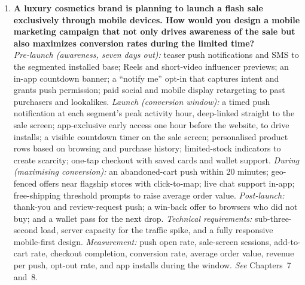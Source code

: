 \begin{enumerate}[leftmargin=2.2em,itemsep=1.4ex]
\item \textbf{A luxury cosmetics brand is planning to launch a flash sale
      exclusively through mobile devices. How would you design a mobile marketing
      campaign that not only drives awareness of the sale but also maximizes
      conversion rates during the limited time?}
      \\
      \emph{Pre-launch (awareness, seven days out):} teaser push notifications and
      SMS to the segmented installed base; Reels and short-video influencer
      previews; an in-app countdown banner; a ``notify me'' opt-in that captures
      intent and grants push permission; paid social and mobile display
      retargeting to past purchasers and lookalikes.
      \emph{Launch (conversion window):} a timed push notification at each
      segment's peak activity hour, deep-linked straight to the sale screen;
      app-exclusive early access one hour before the website, to drive installs; a
      visible countdown timer on the sale screen; personalised product rows based
      on browsing and purchase history; limited-stock indicators to create
      scarcity; one-tap checkout with saved cards and wallet support.
      \emph{During (maximising conversion):} an abandoned-cart push within 20
      minutes; geo-fenced offers near flagship stores with click-to-map; live chat
      support in-app; free-shipping threshold prompts to raise average order value.
      \emph{Post-launch:} thank-you and review-request push; a win-back offer to
      browsers who did not buy; and a wallet pass for the next drop.
      \emph{Technical requirements:} sub-three-second load, server capacity for the
      traffic spike, and a fully responsive mobile-first design.
      \emph{Measurement:} push open rate, sale-screen sessions, add-to-cart rate,
      checkout completion, conversion rate, average order value, revenue per push,
      opt-out rate, and app installs during the window.
      \hfill\emph{See} Chapters~7 and~8.


\end{enumerate}
